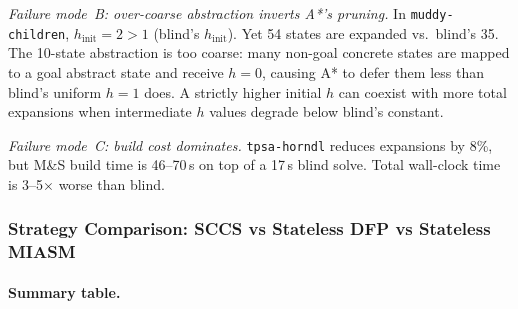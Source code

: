 \documentclass[11pt,a4paper]{article}
\begin{document}
\emph{Failure mode~B: over-coarse abstraction inverts A*'s pruning.}  In
\texttt{muddy-children}, $h_{\mathrm{init}} = 2 > 1$ (blind's $h_{\mathrm{init}}$).
Yet 54 states are expanded vs.\ blind's 35.  The 10-state abstraction is too
coarse: many non-goal concrete states are mapped to a goal abstract state and
receive $h = 0$, causing A* to defer them less than blind's uniform $h = 1$
does.  A strictly higher initial $h$ can coexist with more total expansions
when intermediate $h$ values degrade below blind's constant.

\emph{Failure mode~C: build cost dominates.}  \texttt{tpsa-horndl} reduces
expansions by 8\%, but M\&S build time is 46--70\,s on top of a 17\,s blind
solve.  Total wall-clock time is 3--5$\times$ worse than blind.

\subsubsection{Strategy Comparison: SCCS vs Stateless DFP vs Stateless MIASM}

\paragraph{Summary table.}
\end{document}
